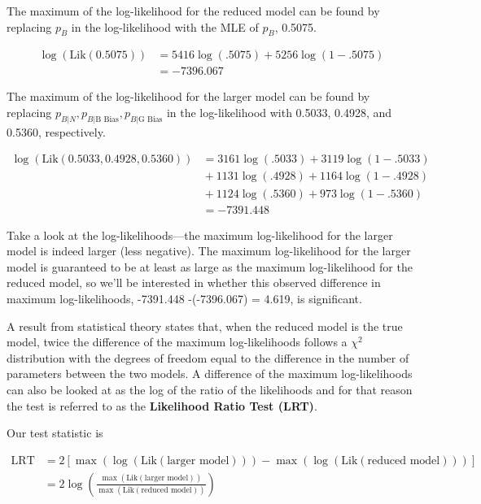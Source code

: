 \documentclass[
]{krantz}
\newcommand{\Lik}{\mathrm{Lik}}
\newcommand{\neutral}{p_{B|N}}
\newcommand{\gbias}{p_{B|\textrm{G Bias}}}
\newcommand{\bbias}{p_{B|\textrm{B Bias}}}
\begin{document}
The maximum of the log-likelihood for the reduced model can be found by replacing \(p_{B}\) in the log-likelihood with the MLE of \(p_{B}\), 0.5075.

\begin{align*}
\log(\Lik(0.5075))& = 5416\log(.5075) + 5256\log(1-.5075)\\
&= -7396.067
\end{align*}

The maximum of the log-likelihood for the larger model can be found by replacing \(\neutral,  \bbias, \gbias\) in the log-likelihood with 0.5033, 0.4928, and 0.5360, respectively.

\begin{align*}
 \log(\Lik(0.5033, 0.4928, 0.5360)) &=  3161\log(.5033)+3119\log(1-.5033)\\
 & {}+ 1131\log(.4928)+1164\log(1-.4928)\\
 & {}+ 1124\log(.5360)+973\log(1-.5360)\\
 &= -7391.448
\end{align*}

Take a look at the log-likelihoods---the maximum log-likelihood for the larger model is indeed larger (less negative). The maximum log-likelihood for the larger model is guaranteed to be at least as large as the maximum log-likelihood for the reduced model, so we'll be interested in whether this observed difference in maximum log-likelihoods, -7391.448 -(-7396.067) = 4.619, is significant.

A result from statistical theory states that, when the reduced model is the true model, twice the difference of the maximum log-likelihoods follows a \(\chi^2\) distribution with the degrees of freedom equal to the difference in the number of parameters between the two models. A difference of the maximum log-likelihoods can also be looked at as the log of the ratio of the likelihoods and for that reason the test is referred to as the \textbf{Likelihood Ratio Test (LRT)}. 

Our test statistic is

\begin{equation*}
\begin{split}    
 \textrm{LRT} &= 2[\max(\log(\Lik(\textrm{larger model}))) - \max(\log(\Lik(\textrm{reduced model})))] \\
     &= 2\log\left(\frac{\max(\Lik(\textrm{larger  model}))}{\max(\Lik(\textrm{reduced model}))} \right)
\end{split}
\end{equation*}
\end{document}
